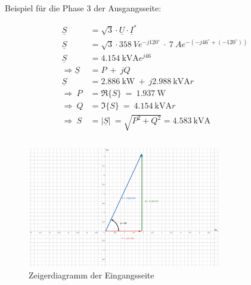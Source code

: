 \begin{enumerate}[label=\alph*)]
	      Beispiel für die Phase 3 der Ausgangsseite:
	      \begin{center}
		      \begin{align*}
			      \underline{S}                 & = \sqrt{3}\cdot\underline{U}\cdot\underline{I}^*                                                   \\
			      \underline{S}                 & = \sqrt{3}\cdot 358\ Ve^{-j120^\circ}\ \cdot\ 7\ Ae^{-(-j46^\circ+(-120^\circ))}                   \\
			      \underline{S}                 & = \SI{4,154}{\kilo\volt\ampere}e^{j46}                                                             \\
			      \Longrightarrow \underline{S} & =  P\ +\ jQ                                                                                        \\
			      \underline{S}                 & = \SI{2,886}{\kilo\watt}\ +\ j\SI{2,988}{\kilo\volt\ampere r}                                      \\
			      \Longrightarrow\ P            & = \Re{\{S\}}\                                                   =\   \SI{1,937}{\watt}             \\
			      \Longrightarrow\ Q            & = \Im{\{S\}}\                                                   =\ \SI{4,154}{\kilo\volt\ampere r} \\
			      \Longrightarrow\ S            & =  \left\lvert {\underline{S}}  \right\rvert\ = \sqrt{P^2+Q^2} = \SI{4,583}{\kilo\volt\ampere}     \\               \\
		      \end{align*}
	      \end{center}

	      \begin{figure}[h!]
		      \begin{center}
			      \includegraphics[width=0.75\textwidth]{img/4.2.1.1}
		      \end{center}
		      \caption{Zeigerdiagramm der Eingangsseite}\label{img:4.2.1.1}
	      \end{figure}


\end{enumerate}
